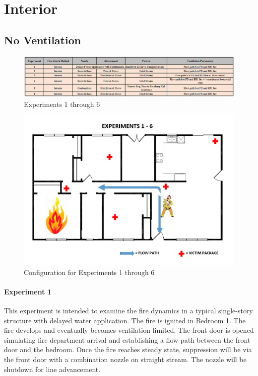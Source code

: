 \documentclass[12pt,oneside]{book}
\begin{document}
\section{Interior}
\subsection{No Ventilation}

\begin{figure}[H]
	\centering
	\includegraphics[width=7in]{Figures/General/Exp1to6.png}
	\caption{Experiments 1 through 6}
	\label{fig:Exp1to6}
\end{figure}

\begin{figure}[H]
	\centering
	\includegraphics[width=5in]{Figures/General/Exps1through6.png}
	\caption{Configuration for Experiments 1 through 6}
	\label{fig:ExpConfig1to6}
\end{figure}

\clearpage

\paragraph{Experiment 1} \mbox{}

This experiment is intended to examine the fire dynamics in a typical single-story structure with delayed water application. The fire is ignited in Bedroom 1. The fire develops and eventually becomes ventilation limited. The front door is opened simulating fire department arrival and establishing a flow path between the front door and the bedroom. Once the fire reaches steady state, suppression will be via the front door with a combination nozzle on straight stream. The nozzle will be shutdown for line advancement. 
\end{document}
